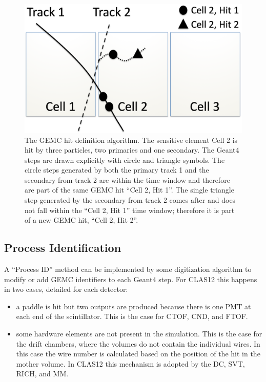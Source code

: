 \begin{figure}
	\centering
	\includegraphics[width=0.99\columnwidth,keepaspectratio]{img/hitDefinition.png}
	\caption{The GEMC hit definition algorithm. The sensitive element Cell 2 is hit by three particles, two primaries and one secondary.
             The Geant4 steps are drawn explicitly with circle and triangle symbols. The circle steps generated by both the primary track 1 and the secondary
             from track 2 are within the time window and therefore are part of the same GEMC hit ``Cell 2, Hit 1''.
             The single triangle step generated by the secondary from track 2 comes after and does not fall within the ``Cell 2, Hit 1''
             time window; therefore it is part of a new GEMC hit, ``Cell 2, Hit 2''.}
	\label{fig:hitDefinition}
\end{figure}

\subsection{Process Identification}

A ``Process ID'' method can be implemented by some digitization algorithm to modify or add GEMC identifiers to each Geant4 step. For CLAS12 this happens in two
cases, detailed for each detector:

\begin{itemize}
	\item a paddle is hit but two outputs are produced because there is one PMT at each end of the scintillator. This
          is the case for CTOF, CND, and FTOF.
    \item some hardware elements are not present in the simulation. This is the case for the drift chambers, where the volumes do not contain
          the individual wires. In this case the wire number is calculated based on the position of the hit in the mother volume. In CLAS12 this mechanism
          is adopted by the DC, SVT, RICH, and MM.
\end{itemize}


